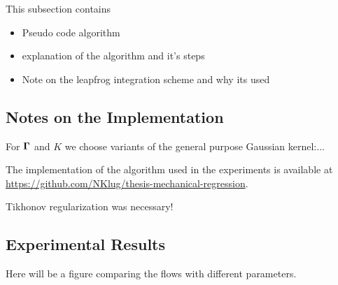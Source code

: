 This subsection contains
\begin{itemize}
	\item Pseudo code algorithm
	\item explanation of the algorithm and it's steps
	\item Note on the leapfrog integration scheme and why its used
\end{itemize}

\subsection{Notes on the Implementation}

For $\mathbf{\Gamma}$ and $K$ we choose variants of the general purpose Gaussian kernel:...

The implementation of the algorithm used in the experiments is available at \href{https://github.com/NKlug/thesis-mechanical-regression}{https://github.com/NKlug/thesis-mechanical-regression}.

Tikhonov regularization was necessary!

\subsection{Experimental Results}

Here will be a figure comparing the flows with different parameters.

